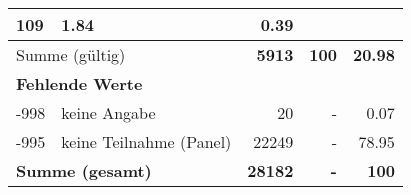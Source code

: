 \begin{longtable}{lXrrr}
       \num{109} &
       \num[round-mode=places,round-precision=2]{1.84} &
         \num[round-mode=places,round-precision=2]{0.39} \\
     \midrule
     \multicolumn{2}{l}{Summe (gültig)} &
       \textbf{\num{5913}} &
     \textbf{100} &
       \textbf{\num[round-mode=places,round-precision=2]{20.98}} \\
     \multicolumn{5}{l}{\textbf{Fehlende Werte}}\\
       -998 &
       keine Angabe &
         \num{20} &
        - &
         \num[round-mode=places,round-precision=2]{0.07} \\
       -995 &
       keine Teilnahme (Panel) &
         \num{22249} &
        - &
         \num[round-mode=places,round-precision=2]{78.95} \\
     \midrule
     \multicolumn{2}{l}{\textbf{Summe (gesamt)}} &
          \textbf{\num{28182}} &
        \textbf{-} &
        \textbf{100} \\
     \bottomrule
     \end{longtable}
     
